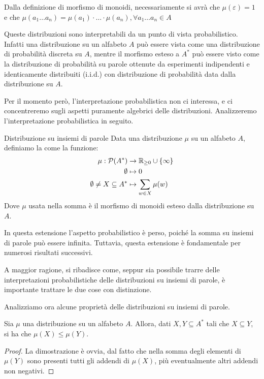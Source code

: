 Dalla definizione di morfismo di monoidi, necessariamente si avrà che \(\mu(\varepsilon) = 1\) e che \(\mu(a_1\ldots a_n) = \mu(a_1)\cdot\ldots\cdot \mu(a_n), \forall a_1\ldots a_n \in A\)

\begin{note}{}
  Queste distribuzioni sono interpretabili da un punto di vista probabilistico.
  Infatti una distribuzione su un alfabeto \(A\) può essere vista come una distribuzione di probabilità discreta su \(A\),
  mentre il morfismo esteso a \(A^*\) può essere visto come la distribuzione di probabilità su parole ottenute da esperimenti indipendenti e identicamente distribuiti (i.i.d.) con distribuzione di probabilità data dalla distribuzione su \(A\).
  
  Per il momento però, l'interpretazione probabilistica non ci interessa, e ci concentreremo sugli aspetti puramente algebrici delle distribuzioni.
  Analizzeremo l'interpretazione probabilistica in seguito.
\end{note}

\begin{definition}{Distribuzione su insiemi di parole}
  Data una distribuzione \(\mu\) su un alfabeto \(A\), definiamo la  come la funzione:
  \begin{equation*}
    \begin{aligned}
      \mu: \mathcal{P}(A^*) &\to \R_{\geq 0} \cup \set{\infty} \\
                  \emptyset &\mapsto 0 \\
                 \emptyset \neq X \subseteq A^* &\mapsto \sum_{w \in X} \mu(w)
    \end{aligned}
  \end{equation*}
  Dove \(\mu\) usata nella somma è il morfismo di monoidi esteso dalla distribuzione su \(A\).  
\end{definition}

\begin{note}{}
  In questa estensione l'aspetto probabilistico è perso, poiché la somma su insiemi di parole può essere infinita.
  Tuttavia, questa estensione è fondamentale per numerosi risultati successivi.

  A maggior ragione, si ribadisce come, seppur sia possibile trarre delle interpretazioni probabilistiche delle distribuzioni su insiemi di parole, è importante trattare le due cose con distinzione.
\end{note}

Analizziamo ora alcune proprietà delle distribuzioni su insiemi di parole.
\begin{proposition}[label=prop:distribution_monotonicity]{}
  Sia \(\mu\) una distribuzione su un alfabeto \(A\).
  Allora, dati \(X,Y \subseteq A^*\) tali che \(X \subseteq Y\), si ha che \(\mu(X) \leq \mu(Y)\).
\end{proposition}
\begin{proof}
  La dimostrazione è ovvia, dal fatto che nella somma degli elementi di \(\mu(Y)\) sono presenti tutti gli addendi di \(\mu(X)\), più eventualmente altri addendi non negativi.
\end{proof}

